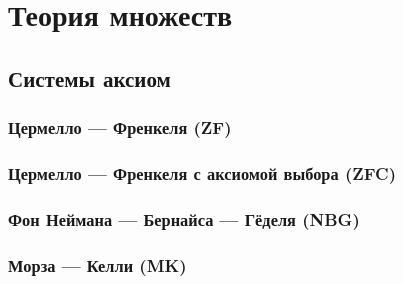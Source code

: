 \chapter{Теория множеств}

\section{Системы аксиом}
\subsection{Цермелло --- Френкеля (ZF)}
\subsection{Цермелло --- Френкеля с аксиомой выбора (ZFC)}
\subsection{Фон Неймана --- Бернайса --- Гёделя (NBG)}
\subsection{Морза --- Келли (MK)}

